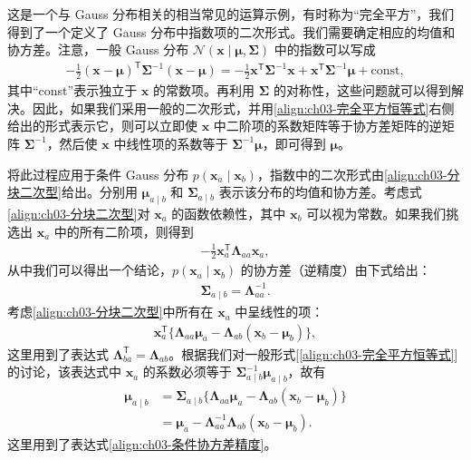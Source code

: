 \documentclass[../../main.tex]{subfiles}
\begin{document}
这是一个与 Gauss 分布相关的相当常见的运算示例，有时称为“完全平方”，我们得到了一个定义了 Gauss 分布中指数项的二次形式。我们需要确定相应的均值和协方差。注意，一般 Gauss 分布 $\mathcal{N}(\boldsymbol{x}\mid\boldsymbol{\mu},\boldsymbol{\Sigma})$ 中的指数可以写成
\begin{align}
-\frac{1}{2}(\boldsymbol{x}-\boldsymbol{\mu})^{\mathsf{T}}\boldsymbol{\Sigma}^{-1}(\boldsymbol{x}-\boldsymbol{\mu})=-\frac{1}{2}\boldsymbol{x}^{\mathsf{T}}\boldsymbol{\Sigma}^{-1}\boldsymbol{x}+\boldsymbol{x}^{\mathsf{T}}\boldsymbol{\Sigma}^{-1}\boldsymbol{\mu}+\text{const},
\label{align:ch03-完全平方恒等式}
\end{align}
其中“const”表示独立于 $\boldsymbol{x}$ 的常数项。再利用 $\boldsymbol{\Sigma}$ 的对称性，这些问题就可以得到解决。因此，如果我们采用一般的二次形式，并用\eqref{align:ch03-完全平方恒等式}右侧给出的形式表示它，则可以立即使 $\boldsymbol{x}$ 中二阶项的系数矩阵等于协方差矩阵的逆矩阵 $\boldsymbol{\Sigma}^{-1}$，然后使 $\boldsymbol{x}$ 中线性项的系数等于 $\boldsymbol{\Sigma}^{-1}\boldsymbol{\mu}$，即可得到 $\boldsymbol{\mu}$。

将此过程应用于条件 Gauss 分布 $p(\boldsymbol{x}_{a}\mid\boldsymbol{x}_{b})$，指数中的二次形式由\eqref{align:ch03-分块二次型}给出。分别用 $\boldsymbol{\mu}_{a\mid b}$ 和 $\boldsymbol{\Sigma}_{a\mid b}$ 表示该分布的均值和协方差。考虑式\eqref{align:ch03-分块二次型}对 $\boldsymbol{x}_{a}$ 的函数依赖性，其中 $\boldsymbol{x}_{b}$ 可以视为常数。如果我们挑选出 $\boldsymbol{x}_{a}$ 中的所有二阶项，则得到
\begin{align}
-\frac{1}{2}\boldsymbol{x}_{a}^{\mathsf{T}}\boldsymbol{\Lambda}_{aa}\boldsymbol{x}_{a},
\label{align:ch03-条件二阶项}
\end{align}
从中我们可以得出一个结论，$p(\boldsymbol{x}_{a}\mid\boldsymbol{x}_{b})$ 的协方差（逆精度）由下式给出：
\begin{align}
\boldsymbol{\Sigma}_{a\mid b}=\boldsymbol{\Lambda}_{aa}^{-1}.
\label{align:ch03-条件协方差精度}
\end{align}
考虑\eqref{align:ch03-分块二次型}中所有在 $\boldsymbol{x}_{a}$ 中呈线性的项：
\begin{align}
\boldsymbol{x}_{a}^{\mathsf{T}}\bigl\{\boldsymbol{\Lambda}_{aa}\boldsymbol{\mu}_{a}-\boldsymbol{\Lambda}_{ab}(\boldsymbol{x}_{b}-\boldsymbol{\mu}_{b})\bigr\},
\label{align:ch03-条件线性项}
\end{align}
这里用到了表达式 $\boldsymbol{\Lambda}_{ba}^{\mathsf{T}}=\boldsymbol{\Lambda}_{ab}$。根据我们对一般形式[\eqref{align:ch03-完全平方恒等式}]的讨论，该表达式中 $\boldsymbol{x}_{a}$ 的系数必须等于 $\boldsymbol{\Sigma}_{a\mid b}^{-1}\boldsymbol{\mu}_{a\mid b}$，故有
\begin{align}
\boldsymbol{\mu}_{a\mid b}&=\boldsymbol{\Sigma}_{a\mid b}\bigl\{\boldsymbol{\Lambda}_{aa}\boldsymbol{\mu}_{a}-\boldsymbol{\Lambda}_{ab}(\boldsymbol{x}_{b}-\boldsymbol{\mu}_{b})\bigr\}\nonumber\\
&=\boldsymbol{\mu}_{a}-\boldsymbol{\Lambda}_{aa}^{-1}\boldsymbol{\Lambda}_{ab}(\boldsymbol{x}_{b}-\boldsymbol{\mu}_{b}).
\label{align:ch03-条件均值精度}
\end{align}
这里用到了表达式\eqref{align:ch03-条件协方差精度}。
\end{document}
